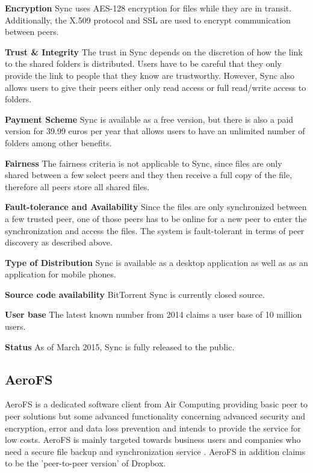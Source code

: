\textbf{Encryption}
Sync uses AES-128 encryption for files while they are in transit. Additionally, the X.509 protocol and SSL are used to encrypt communication between peers.

\textbf{Trust \& Integrity}
The trust in Sync depends on the discretion of how the link to the shared folders is distributed. Users have to be careful that they only provide the link to people that they know are trustworthy. However, Sync also allows users to give their peers either only read access or full read/write access to folders.

\textbf{Payment Scheme}
Sync is available as a free version, but there is also a paid version for 39.99 euros per year that allows users to have an unlimited number of folders among other benefits.

\textbf{Fairness}
The fairness criteria is not applicable to Sync, since files are only shared between a few select peers and they then receive a full copy of the file, therefore all peers store all shared files.

\textbf{Fault-tolerance and Availability}
Since the files are only synchronized between a few trusted peer, one of those peers has to be online for a new peer to enter the synchronization and access the files. The system is fault-tolerant in terms of peer discovery as described above.

\textbf{Type of Distribution}
Sync is available as a desktop application as well as as an application for mobile phones.

\textbf{Source code availability}
BitTorrent Sync is currently closed source.

\textbf{User base}
The latest known number from 2014 claims a user base of 10 million users.

\textbf{Status}
As of March 2015, Sync is fully released to the public.

\subsection{AeroFS} %
AeroFS is a dedicated software client from Air Computing providing basic peer to peer solutions but some advanced functionality concerning advanced security and encryption, error and data loss prevention and intends to provide the service for low costs. AeroFS is mainly targeted towards business users and companies who need a secure file backup and synchronization service \cite{aerofs}. AeroFS in addition claims to be the 'peer-to-peer version' of Dropbox.

